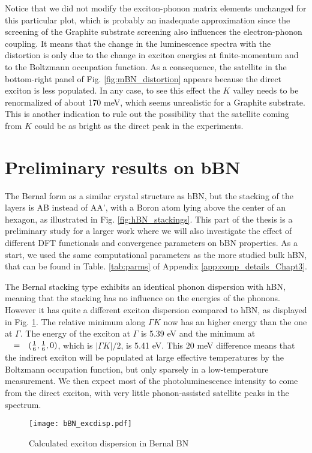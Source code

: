 Notice that we did not modify the exciton-phonon matrix elements unchanged for this particular plot, which is probably an inadequate approximation since the screening of the Graphite substrate screening also influences the electron-phonon coupling.\cite{sohier2021remote} It means that the change in the luminescence spectra with the distortion is only due to the change in exciton energies at finite-momentum and to the Boltzmann occupation function. As a consequence, the satellite in the bottom-right panel of Fig. \ref{fig:mBN_distortion} appears because the direct exciton is less populated. In any case, to see this effect the $K$ valley needs to be renormalized of about 170 meV, which seems unrealistic for a Graphite substrate. This is another indication to rule out the possibility that the satellite coming from $K$ could be as bright as the direct peak in the experiments.

%
\section{Preliminary results on bBN}
The Bernal form as a similar crystal structure as \acrshort{hBN}, but the stacking of the layers is AB instead of AA', with a Boron atom lying above the center of an hexagon, as illustrated in Fig. \ref{fig:hBN_stackings}.
This part of the thesis is a preliminary study for a larger work where we will also investigate the effect of different \acrshort{DFT} functionals and convergence parameters on \acrshort{bBN} properties. As a start, we used the same computational parameters as the more studied bulk \acrshort{hBN}, that can be found in Table. \ref{tab:parms} of Appendix \ref{app:comp_details_Chapt3}.

The Bernal stacking type exhibits an identical phonon dispersion with \acrshort{hBN}, meaning that the stacking has no influence on the energies of the phonons. However it has quite a different exciton dispersion compared to hBN, as displayed in Fig. \ref{fig:bBN_excdisp}. The relative minimum along $\Gamma K$ now has an higher energy than the one at $\Gamma$. The energy of the exciton at $\Gamma$ is 5.39 eV and the minimum at $\qq=(\tfrac{1}{6},\tfrac{1}{6},0)$, which is $|\Gamma K|/2$, is 5.41 eV. This $20$ meV difference means that the indirect exciton will be populated at large effective temperatures by the Boltzmann occupation function, but only sparsely in a low-temperature measurement. We then expect most of the photoluminescence intensity to come from the direct exciton, with very little phonon-assisted satellite peaks in the spectrum.
\begin{figure}[H]
	\vspace{0.2cm}
	\setcapindent{2em}
	\centering
	\texttt{[image: bBN\_excdisp.pdf]}
	\caption{Calculated exciton dispersion in Bernal BN} %
    \label{fig:bBN_excdisp} 
\end{figure}

